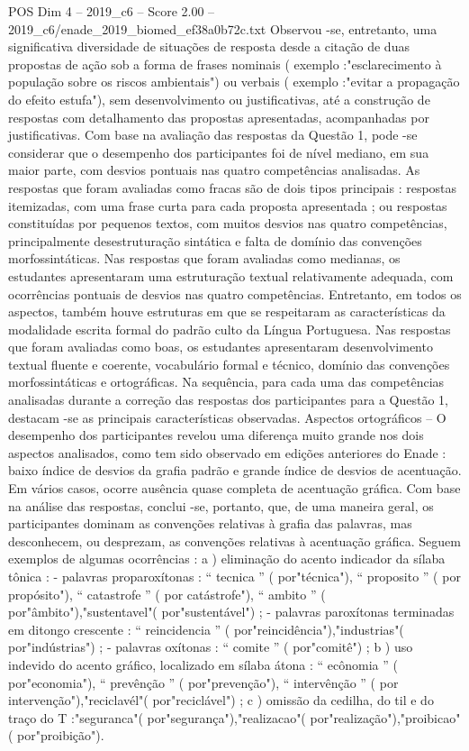 \begin{textsample}{POS Dim 4 – 2019\_c6 – Score 2.00 – 2019\_c6/enade\_2019\_biomed\_ef38a0b72c.txt}
Observou -se, entretanto, uma significativa diversidade de situações de resposta desde a citação de duas propostas de ação sob a forma de frases nominais ( exemplo :"esclarecimento à população sobre os riscos ambientais") ou verbais ( exemplo :"evitar a propagação do efeito estufa"), sem desenvolvimento ou justificativas, até a construção de respostas com detalhamento das propostas apresentadas, acompanhadas por justificativas.
Com base na avaliação das respostas da Questão 1, pode -se considerar que o desempenho dos participantes foi de nível mediano, em sua maior parte, com desvios pontuais nas quatro competências analisadas.
As respostas que foram avaliadas como fracas são de dois tipos principais : respostas itemizadas, com uma frase curta para cada proposta apresentada ; ou respostas constituídas por pequenos textos, com muitos desvios nas quatro competências, principalmente desestruturação sintática e falta de domínio das convenções morfossintáticas.
Nas respostas que foram avaliadas como medianas, os estudantes apresentaram uma estruturação textual relativamente adequada, com ocorrências pontuais de desvios nas quatro competências.
Entretanto, em todos os aspectos, também houve estruturas em que se respeitaram as características da modalidade escrita formal do padrão culto da Língua Portuguesa.
Nas respostas que foram avaliadas como boas, os estudantes apresentaram desenvolvimento textual fluente e coerente, vocabulário formal e técnico, domínio das convenções morfossintáticas e ortográficas.
Na sequência, para cada uma das competências analisadas durante a correção das respostas dos participantes para a Questão 1, destacam -se as principais características observadas.
Aspectos ortográficos – O desempenho dos participantes revelou uma diferença muito grande nos dois aspectos analisados, como tem sido observado em edições anteriores do Enade : baixo índice de desvios da grafia padrão e grande índice de desvios de acentuação.
Em vários casos, ocorre ausência quase completa de acentuação gráfica.
Com base na análise das respostas, conclui -se, portanto, que, de uma maneira geral, os participantes dominam as convenções relativas à grafia das palavras, mas desconhecem, ou desprezam, as convenções relativas à acentuação gráfica.
Seguem exemplos de algumas ocorrências : a ) eliminação do acento indicador da sílaba tônica : - palavras proparoxítonas : “ tecnica ” ( por"técnica"), “ proposito ” ( por propósito"), “ catastrofe ” ( por catástrofe"), “ ambito ” ( por"âmbito"),"sustentavel"( por"sustentável") ; - palavras paroxítonas terminadas em ditongo crescente : “ reincidencia ” ( por"reincidência"),"industrias"( por"indústrias") ; - palavras oxítonas : “ comite ” ( por"comitê") ; b ) uso indevido do acento gráfico, localizado em sílaba átona : “ ecônomia ” ( por"economia"), “ prevênção ” ( por"prevenção"), “ intervênção ” ( por intervenção"),"reciclavél"( por"reciclável") ; c ) omissão da cedilha, do til e do traço do T :"seguranca"( por"segurança"),"realizacao"( por"realização"),"proibicao"( por"proibição").

\end{textsample}
